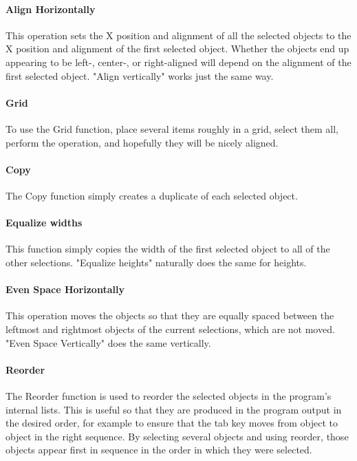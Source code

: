 \paragraph{Align Horizontally}
This operation sets the X position and alignment
of all the selected objects to the X position and alignment of
the first selected object. Whether the objects end up appearing to be
left-, center-, or right-aligned will depend on the alignment of the
first selected object. "Align vertically"
works just the same way.

\paragraph{Grid}
To use the Grid function, place several items roughly in a grid, select
them all, perform the operation, and hopefully they will be nicely
aligned.

\paragraph{Copy}
The Copy function simply creates a duplicate of each selected object.

\paragraph{Equalize widths}
This function simply copies the width of the first
selected object to all of the other selections. "Equalize
heights" naturally does the same for heights.

\paragraph{Even Space Horizontally}
This operation moves the objects so that they are
equally spaced between the leftmost and rightmost objects of the
current selections, which are not moved. "Even Space
Vertically" does the same vertically.

\paragraph{Reorder}
The Reorder function is used to reorder the selected objects in the
program's internal lists. This is useful so that they
are produced in the program output in the desired order, for example to
ensure that the tab key moves from object to object in the right
sequence. By selecting several objects and using reorder, those objects
appear first in sequence in the order in which they were selected.

